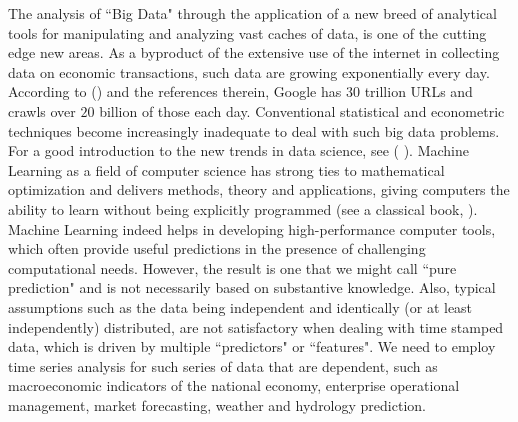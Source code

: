 \documentclass[twoside,11pt]{article}
\begin{document}
The analysis of ``Big Data" through the application of a new breed of analytical tools for manipulating and analyzing vast caches of data, is one of the cutting edge new areas. As a byproduct of the extensive use of the internet in collecting data on economic transactions, such data are growing exponentially every day. According to (\citealp{varian2014big}) and the references therein, Google has $30$ trillion URLs and crawls over $20$ billion of those each day.
Conventional statistical and econometric techniques become increasingly inadequate to deal with such big data problems. For a good introduction to the new trends in data science, see ( \citealp{Blei2017Science}).
Machine Learning as a field of computer science has strong ties to mathematical optimization and delivers methods, theory and applications, giving computers the ability to learn without being explicitly programmed (see a classical book, \citealp{mohri2012foundations}).
Machine Learning indeed helps in developing high-performance computer tools, which often provide useful predictions in the presence of challenging computational needs. However, the result is one that we might call ``pure prediction" and is not necessarily based on substantive knowledge. Also, typical assumptions such as the data being independent and identically (or at least independently) distributed, are not satisfactory when dealing with time stamped data, which is driven by multiple ``predictors" or ``features".
We need to employ time series analysis for such series of data that are dependent,
such as macroeconomic indicators of the national economy, enterprise operational management, market forecasting, weather and hydrology prediction.
\end{document}
